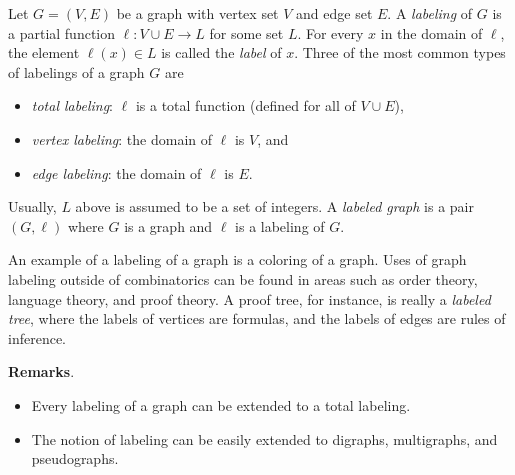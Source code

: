 \documentclass[12pt]{article}
\begin{document}
Let $G=(V,E)$ be a graph with vertex set $V$ and edge set $E$.  A \emph{labeling} of $G$ is a partial function $\ell: V\cup E\to L$ for some set $L$.  For every $x$ in the domain of $\ell$, the element $\ell(x)\in L$ is called the \emph{label} of $x$.  Three of the most common types of labelings of a graph $G$ are
\begin{itemize}
\item \emph{total labeling}: $\ell$ is a total function (defined for all of $V\cup E$),
\item \emph{vertex labeling}: the domain of $\ell$ is $V$, and
\item \emph{edge labeling}: the domain of $\ell$ is $E$.
\end{itemize}
Usually, $L$ above is assumed to be a set of integers.  A \emph{labeled graph} is a pair $(G,\ell)$ where $G$ is a graph and $\ell$ is a labeling of $G$.

An example of a labeling of a graph is a coloring of a graph.  Uses of graph labeling outside of combinatorics can be found in areas such as order theory, language theory, and proof theory.  A proof tree, for instance, is really a \emph{labeled tree}, where the labels of vertices are formulas, and the labels of edges are rules of inference.

\textbf{Remarks}.  
\begin{itemize}
\item
Every labeling of a graph can be extended to a total labeling.
\item
The notion of labeling can be easily extended to digraphs, multigraphs, and pseudographs.
\end{itemize}
\end{document}
